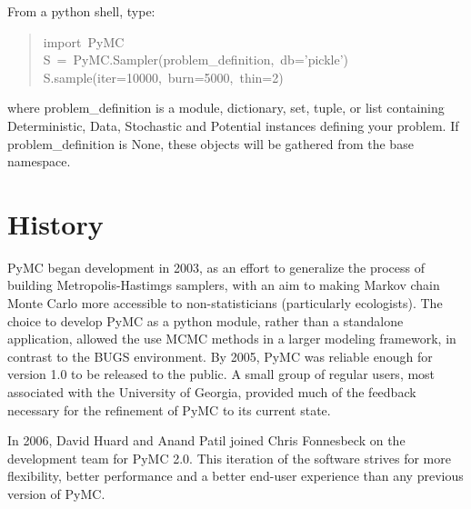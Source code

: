 From a python shell, type:
\begin{quote}{\ttfamily \raggedright \noindent
import~PyMC~\\
S~=~PyMC.Sampler(problem{\_}definition,~db='pickle')~\\
S.sample(iter=10000,~burn=5000,~thin=2)
}\end{quote}

where problem{\_}definition is a module, dictionary, set, tuple, or list containing Deterministic, Data,
Stochastic and Potential instances defining your problem. If problem{\_}definition is None, these objects will be gathered from the base namespace.



\hypertarget{history}{}
\section*{History}
\label{history}

PyMC began development in 2003, as an effort to generalize the process of building Metropolis-Hastimgs samplers, with an aim to making Markov chain Monte Carlo more accessible to non-statisticians (particularly ecologists). The choice to develop PyMC as a python module, rather than a standalone application, allowed the use MCMC methods in a larger modeling framework, in contrast to the BUGS environment. By 2005, PyMC was reliable enough for version 1.0 to be released to the public. A small group of regular users, most associated with the University of Georgia, provided much of the feedback necessary for the refinement of PyMC to its current state.

In 2006, David Huard and Anand Patil joined Chris Fonnesbeck on the development team for PyMC 2.0. This iteration of the software strives for more flexibility, better performance and a better end-user experience than any previous version of PyMC.



\